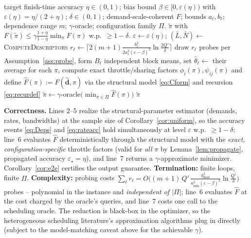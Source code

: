 \documentclass{amsart}
\theoremstyle{definition}
\begin{document}
\begin{algorithm}[h]
\caption{EstimatedOptimalMapping}\label{alg:map}
\begin{algorithmic}[1]
\Require target finish-time accuracy $\eta\in(0,1)$; bias bound $\beta\in[0,\varepsilon(\eta))$ with $\varepsilon(\eta)=\eta/(2+\eta)$; $\delta\in(0,1)$; demand-scale-coherent $F$; bounds $a_\ell,b_\ell$; dependence range $m$; $\gamma$-oracle; configuration family $\Pi$.
\Ensure $\tilde\pi$ with $F(\tilde\pi)\le\gamma\frac{1+\eta}{1-\eta}\min_\pi F(\pi)$ w.p.\ $\ge1-\delta$.
\State $\varepsilon\gets\varepsilon(\eta)$; $(\bar L,\bar N)\gets$ \textsc{ComputeDescriptors}
  \State $r_\ell\gets\big\lceil 2(m+1)\frac{b_\ell^2}{2a_\ell^2(\varepsilon-\beta)^2}\ln\frac{2Q'}{\delta}\big\rceil$ 
  \State draw $r_\ell$ probes per Assumption~\ref{ass:probe}, form $B_\ell$ independent block means, set $\widehat\theta_\ell\gets$ their average
\EndFor
\State for each $\pi$, compute exact throttle/sharing factors $\phi_i(\pi),\psi_{ij}(\pi)$ and define $\widehat F(\pi):=F(\widehat{\mathbf d},\pi)$ via the structural model \eqref{eq:Cform} and recursion \eqref{eq:recurdef}
\State $\tilde\pi\gets\gamma$-oracle$\big(\min_{\pi\in\Pi}\widehat F(\pi)\big)$
\State \Return $\tilde\pi$
\end{algorithmic}
\end{algorithm}

\noindent\textbf{Correctness.} Lines 2--5 realize the structural-parameter
estimator (demands, rates, bandwidths) at the sample size of
Corollary~\ref{cor:uniform}, so the accuracy events \eqref{eq:Deps} and
\eqref{eq:rateacc} hold simultaneously at level $\varepsilon$ w.p.\ $\ge1-\delta$;
line~6 evaluates $\widehat F$ deterministically through the structural model
with the \emph{exact, configuration-specific} throttle factors (valid for
\emph{all} $\pi$ by Lemma~\ref{lem:propagate}, propagated accuracy
$\varepsilon_\star=\eta$), and line~7 returns a $\gamma$-approximate minimizer.
Corollary~\ref{cor:e2e} certifies the output guarantee. \textbf{Termination:}
finite loops, finite $\Pi$. \textbf{Complexity:} probing costs
$\sum_\ell r_\ell=O\!\big((m{+}1)\,Q'\,\frac{b_{\max}^2}{a_{\min}^2(\varepsilon-\beta)^2}\ln\frac{Q'}{\delta}\big)$
probes -- polynomial in the instance and \emph{independent of $|\Pi|$}; line~6
evaluates $\widehat F$ at the cost charged by the oracle's queries, and line~7
costs one call to the scheduling oracle. The reduction is black-box in the
optimizer, so the heterogeneous scheduling literature's approximation algorithms
plug in directly (subject to the model-matching caveat above for the achievable
$\gamma$).
\end{document}
